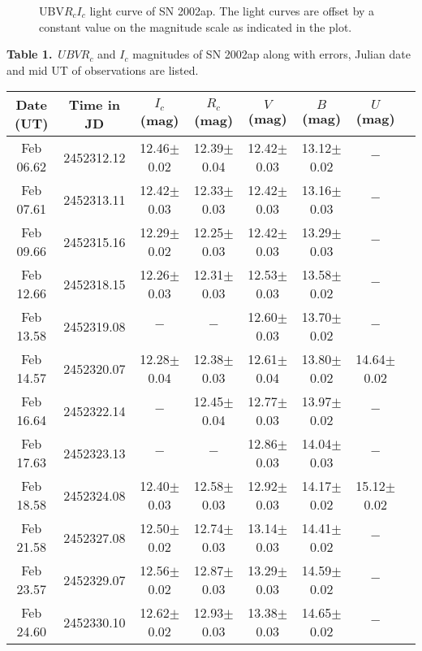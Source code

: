 \begin{figure}
\caption{UBV$R_cI_c$ light curve of SN 2002ap. The light curves are offset by a
constant value on the magnitude scale as indicated in the plot.} 
\end{figure}
    
\begin{table*}

{\bf Table 1.}~$UBVR_c$ and $I_c$ magnitudes of SN 2002ap along with errors, Julian date 
and mid UT of observations are listed.
\scriptsize
\begin{center}
\begin{tabular}{cccccccc} \hline\hline
Date (UT)     & Time in JD & $I_c$ (mag)  &  $R_c$ (mag)  & $V$ (mag) & $B$ (mag) & $U$ (mag) & \\ \hline
Feb 06.62 & 2452312.12  & 12.46$\pm$0.02&12.39$\pm$0.04&12.42$\pm$0.03&13.12$\pm$0.02&$-$&                 \\  
Feb 07.61 & 2452313.11  & 12.42$\pm$0.03&12.33$\pm$0.03&12.42$\pm$0.03&13.16$\pm$0.03&$-$& 				\\
Feb 09.66 & 2452315.16  & 12.29$\pm$0.02&12.25$\pm$0.03&12.42$\pm$0.03&13.29$\pm$0.03&$-$&				\\
Feb 12.66 & 2452318.15  & 12.26$\pm$0.03&12.31$\pm$0.03&12.53$\pm$0.03&13.58$\pm$0.02&$-$&				\\ 
Feb 13.58 & 2452319.08  & $-$      &$-$       &12.60$\pm$0.03&13.70$\pm$0.02&$-$&                               \\ 
Feb 14.57 & 2452320.07  & 12.28$\pm$0.04&12.38$\pm$0.03&12.61$\pm$0.04&13.80$\pm$0.02&14.64$\pm$0.02&           \\  
Feb 16.64 & 2452322.14  & $-$      &12.45$\pm$0.04&12.77$\pm$0.03&13.97$\pm$0.02&$-$&                              \\
Feb 17.63 & 2452323.13  & $-$      &$-$       &12.86$\pm$0.03&14.04$\pm$0.03&$-$&                               \\ 
Feb 18.58 & 2452324.08  & 12.40$\pm$0.03&12.58$\pm$0.03&12.92$\pm$0.03&14.17$\pm$0.02&15.12$\pm$0.02&     			\\ 
Feb 21.58 & 2452327.08  & 12.50$\pm$0.02&12.74$\pm$0.03&13.14$\pm$0.03&14.41$\pm$0.02&$-$&     				\\ 
Feb 23.57 & 2452329.07  & 12.56$\pm$0.02&12.87$\pm$0.03&13.29$\pm$0.03&14.59$\pm$0.02&$-$&    		\\   
Feb 24.60 & 2452330.10  & 12.62$\pm$0.02&12.93$\pm$0.03&13.38$\pm$0.03&14.65$\pm$0.02&$-$&     				\\  

\end{tabular}
\end{center}
\end{table*}

